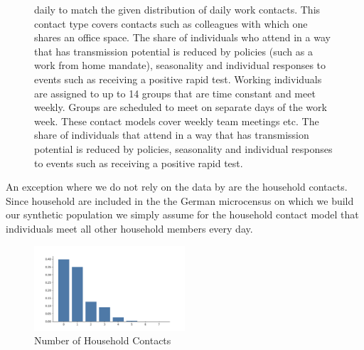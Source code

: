\begin{figure}
{        daily to match the given distribution of daily work contacts. This contact type
        covers contacts such as colleagues with which one shares an office space. The
        share of individuals who attend in a way that has transmission potential is
        reduced by policies (such as a work from home mandate), seasonality and
        individual responses to events such as receiving a positive rapid test.
        Working individuals are assigned to up to 14 groups that are time constant and
        meet weekly. Groups are scheduled to meet on separate days of the work week.
        These contact models cover weekly team meetings etc. The share of individuals
        that attend in a way that has transmission potential is reduced by policies,
        seasonality and individual responses to events such as receiving a positive rapid
        test.}
\end{figure}


An exception where we do not rely on the data by \cite{Mossong2008} are the household
contacts. Since household are included in the the German microcensus
\citep{FDSAeDBUDL2018} on which we build our synthetic population we simply assume for
the household contact model that individuals meet all other household members every day.


\begin{figure}
    \centering
    \includegraphics[width=0.5\textwidth]{figures/results/figures/data/distributions_of_the_number_of_contacts/household}
    \caption{Number of Household Contacts}
    \label{n_contacts_hh}
\end{figure}

\FloatBarrier